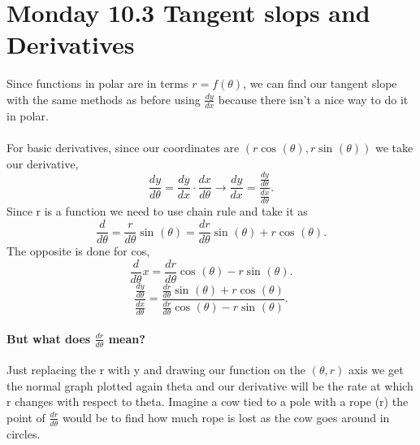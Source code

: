 \section{Monday 10.3 Tangent slops and Derivatives}%
\label{sec:Monday 10.3 Tangent slops and Derivatives}
Since functions in polar are in terms $ r=f\left( \theta \right)  $, we can find our tangent slope with the same methods as before using $ \frac{ dy }{ dx }  $ because there isn't a nice way to do it in polar.\\ \\

For basic derivatives, since our coordinates are $ \left( r\cos^{  } \left( \theta \right) , r\sin^{  } \left( \theta \right)  \right)  $ we take our derivative,
\[
\frac{ dy }{ d\theta} = \frac{ dy }{ dx } \cdot \frac{ dx }{ d\theta }  \to \frac{ dy }{ dx } = \frac{ \frac{ dy }{ d\theta }  }{ \frac{ dx }{ d\theta }  }
.\] 
Since r is a function we need to use chain rule and take it as
\[
\frac{ d }{ d\theta } = \frac{ r }{ d\theta } \sin^{  } \left( \theta \right) = \frac{ dr }{ d\theta } \sin^{  } \left( \theta \right) +r\cos^{  } \left( \theta \right)  
.\] 
The opposite is done for cos,
\[
\frac{ d }{ d\theta } x = \frac{ dr }{ d\theta } \cos^{  } \left( \theta \right) -r\sin^{  } \left( \theta \right) 
.\] 
\[
	\frac{ \frac{ dy }{ d\theta }  }{ \frac{ dx }{ d\theta }  } = \frac{ \frac{ dr }{ d\theta } \sin^{  } \left( \theta \right) +r\cos^{  } \left( \theta \right)  }{ \frac{ dr }{ d\theta } \cos^{  } \left( \theta \right) -r\sin^{  } \left( \theta \right) }
.\] 
\paragraph{But what does $ \frac{ dr }{ d\theta }  $ mean?}
Just replacing the r with y and drawing our function on the $ \left( \theta,r \right)  $ axis we get the normal graph plotted again theta and our derivative will be the rate at which r changes with respect to theta. Imagine a cow tied to a pole with a rope (r) the point of $ \frac{ dr }{ d\theta }  $ would be to find how much rope is lost as the cow goes around in circles.
